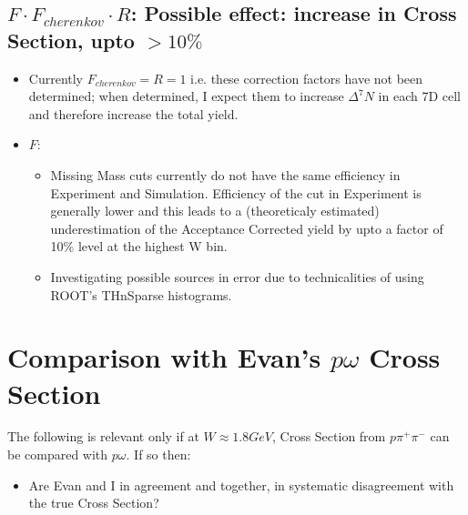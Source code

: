 \documentclass[12pt]{article}
\begin{document}
\subsection{$F \cdot F_{cherenkov} \cdot R$: Possible effect: increase in Cross Section, upto $>10\%$}
\begin{itemize}
	\item Currently $F_{cherenkov} = R = 1$ i.e. these correction factors have not been determined; when determined, I expect them to increase $\Delta^{7} N$ in each 7D cell and therefore increase the total yield.
	\item $F$:
	\begin{itemize}
		\item Missing Mass cuts currently do not have the same efficiency in Experiment and Simulation. Efficiency of the cut in Experiment is generally lower and this leads to a (theoreticaly estimated) underestimation of the Acceptance Corrected yield by upto a factor of 10\% level at the highest W bin.
		\item Investigating possible sources in error due to technicalities of using ROOT's THnSparse histograms.
	\end{itemize}
	
\end{itemize}

\section{Comparison with Evan's $p\omega$ Cross Section}
The following is relevant only if at $W \approx 1.8 GeV$, Cross Section from $p\pi^{+}\pi^{-}$ can be compared with $p\omega$. If so then:
\begin{itemize}
	\item Are Evan and I in agreement and together, in systematic disagreement with the true Cross Section?
\end{itemize}
\end{document}
